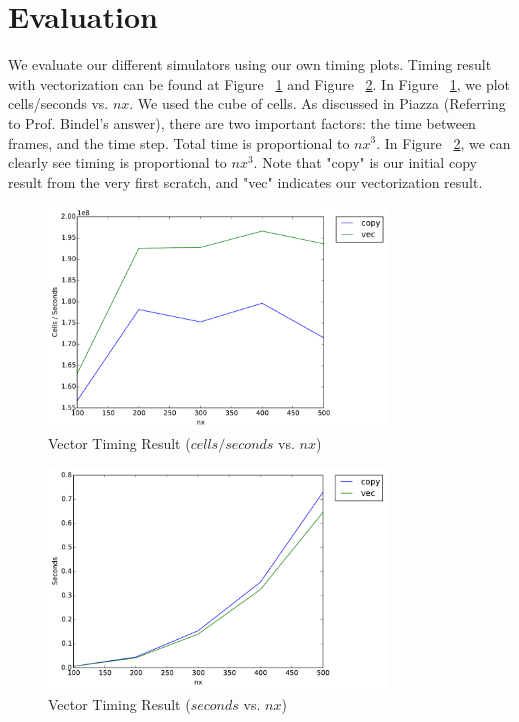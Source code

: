 \section{Evaluation}\label{sec:evaluation}

We evaluate our different simulators using our own timing plots. Timing result with vectorization can be found at Figure ~\ref{fig:vector_timing_result1} and Figure ~\ref{fig:vector_timing_result2}. In Figure ~\ref{fig:vector_timing_result1}, we plot cells/seconds vs. $nx$. We used the cube of cells. As discussed in Piazza (Referring to Prof. Bindel's answer), there are two important factors: the time between frames, and the time step. Total time is proportional to $ nx^{3} $. In Figure ~\ref{fig:vector_timing_result2}, we can clearly see timing is proportional to $ nx^{3} $. Note that "copy" is our initial copy result from the very first scratch, and "vec" indicates our vectorization result.

\begin{figure}[h]
    \centering
    \includegraphics[width=0.8\textwidth]{figs/vec-timing1.pdf}
    \caption{Vector Timing Result ($cells/seconds$ vs. $nx$)}
    \label{fig:vector_timing_result1}
\end{figure}

\begin{figure}[h]
    \centering
    \includegraphics[width=0.8\textwidth]{figs/vec-timing2.pdf}
    \caption{Vector Timing Result ($seconds$ vs. $nx$)}
    \label{fig:vector_timing_result2}
\end{figure}

